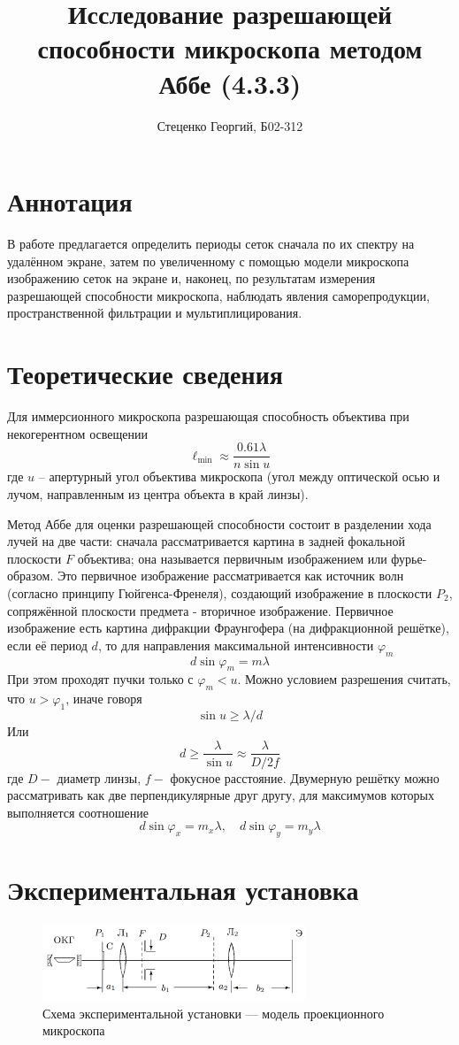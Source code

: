 \documentclass[12pt, a4paper]{article}
\title{Исследование разрешающей способности микроскопа методом Аббе (4.3.3)}
\author{Стеценко Георгий, Б02-312}
\date{}
\begin{document}
\maketitle

\section{Аннотация}
В работе предлагается определить периоды сеток сначала по их спектру на
удалённом экране, затем по увеличенному с помощью модели микроскопа изображению
сеток на экране и, наконец, по результатам измерения разрешающей способности
микроскопа, наблюдать явления саморепродукции, пространственной фильтрации и
мультиплицирования.

\section{Теоретические сведения}

Для иммерсионного микроскопа разрешающая способность объектива при
некогерентном освещении $$ \ell_{\min } \approx \frac{0.61 \lambda}{n \sin u}
$$ где $u$ -- апертурный угол объектива микроскопа (угол между оптической осью
и лучом, направленным из центра объекта в край линзы).

Метод Аббе для оценки разрешающей способности состоит в разделении хода лучей
на две части: сначала рассматривается картина в задней фокальной плоскости $F$
объектива; она называется первичным изображением или фурье-образом. Это
первичное изображение рассматривается как источник волн (согласно принципу
Гюйгенса-Френеля), создающий изображение в плоскости $P_{2}$, сопряжённой
плоскости предмета - вторичное изображение. Первичное изображение есть картина
дифракции Фраунгофера (на дифракционной решётке), если её период $d$, то для
направления максимальной интенсивности $\varphi_{m}$ $$ d \sin \varphi_{m}=m
    \lambda $$ При этом проходят пучки только с $\varphi_{m}<u .$ Можно условием
разрешения считать, что $u>\varphi_{1}$, иначе говоря $$ \sin u \geq \lambda /
    d $$ Или $$ d \geq \frac{\lambda}{\sin u} \approx \frac{\lambda}{D / 2 f} $$
где $D-$ диаметр линзы, $f-$ фокусное расстояние. Двумерную решётку можно
рассматривать как две перпендикулярные друг другу, для максимумов которых
выполняется соотношение $$ d \sin \varphi_{x}=m_{x} \lambda, \quad d \sin
    \varphi_{y}=m_{y} \lambda $$

\newpage
\section{Экспериментальная установка}
\begin{figure}[H]
    \centering
    \includegraphics[width = 0.7\textwidth]{pics/setup.png}
    \caption{Схема экспериментальной установки — модель проекционного
        микроскопа}
    \label{fig:setup}
\end{figure}
\end{document}
